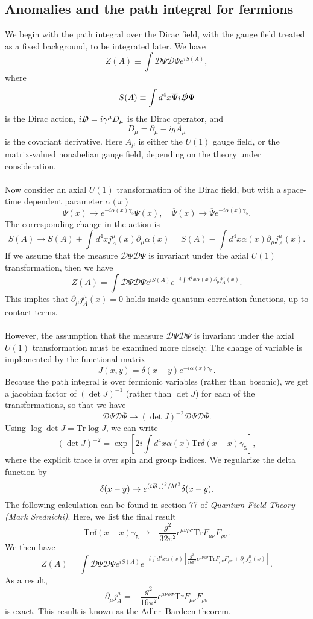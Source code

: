 \subsection{Anomalies and the path integral for fermions}
We begin with the path integral over the Dirac field, with the gauge field treated as a fixed background, to be integrated later. We have
\[Z(A) \equiv \int \mathcal{D}\Psi \mathcal{D}\overline{\Psi} e^{iS(A)},\]
where
\[S(A) \equiv \int d^4x \overline{\Psi}i\slashed{D}\Psi\]
is the Dirac action, $i\slashed{D} = i\gamma^{\mu} D_{\mu}$
is the Dirac operator, and
\[D_{\mu} = \partial_{\mu} - igA_{\mu}\]
is the covariant derivative. 
Here $A_{\mu}$ is either the $U(1)$ gauge field, or the matrix-valued nonabelian gauge field, depending on the theory under consideration.
\\ \\
Now consider an axial $U(1)$ transformation of the Dirac field, but with a space-time dependent parameter $\alpha(x)$
\[\Psi(x) \to e^{-i\alpha(x)\gamma_5}\Psi(x) , \quad \overline{\Psi}(x) \to \overline{\Psi} e^{-i\alpha(x)\gamma_5}.\]
The corresponding change in the action is
\[S(A) \to S(A) + \int d^4x j^{\mu}_A(x) \partial_{\mu}\alpha(x) = S(A) - \int d^4x \alpha(x) \partial_{\mu}j^{\mu}_A(x) .\]
If we assume that the measure $\mathcal{D}\Psi \mathcal{D}\overline{\Psi}$ is invariant under the axial $U(1)$ transformation, then we have
\[Z(A) = \int \mathcal{D}\Psi \mathcal{D}\overline{\Psi} e^{iS(A)} e^{-i \int d^4x \alpha(x)\partial_{\mu}j^{\mu}_A(x) }.\]
This implies that $\partial_{\mu}j^{\mu}_A(x) = 0$ holds inside quantum correlation functions, up to contact terms.
\\ \\
However, the assumption that the measure $\mathcal{D}\Psi \mathcal{D}\overline{\Psi}$ is invariant under the axial $U(1)$ transformation must be examined more closely. The change of variable is implemented by the functional matrix
\[J(x,y) = \delta(x-y)e^{-i\alpha(x)\gamma_5} .\]
Because the path integral is over fermionic variables (rather than bosonic), we get a jacobian factor of $(\det J)^{-1}$ (rather than $\det J$) for each of the transformations, so that we have
\[\mathcal{D}\Psi \mathcal{D}\overline{\Psi} \to (\det J)^{-2}\mathcal{D}\Psi \mathcal{D}\overline{\Psi}.\]
Using $\log \det J = \mathrm{Tr} \log J$, we can write
\[(\det J)^{-2} = \exp \left[2i \int d^4x \alpha(x) \mathrm{Tr}\delta(x-x)\gamma_5 \right],\]
where the explicit trace is over spin and group indices. We regularize the delta function by
\[\delta(x-y) \to e^{(i\slashed{D}_x)^2/M^2} \delta(x-y).\]
The following calculation can be found in section 77 of \emph{Quantum Field Theory (Mark Srednichi)}. Here, we list the final result
\[\mathrm{Tr} \delta(x-x)\gamma_5 \to - \frac{g^2}{32\pi^2} \epsilon^{\mu\nu\rho\sigma} \mathrm{Tr} F_{\mu\nu}F_{\rho\sigma}.\]
We then have
\[Z(A) = \int \mathcal{D}\Psi \mathcal{D}\overline{\Psi} e^{iS(A)} e^{-i \int d^4x \alpha(x)[ \frac{g^2}{16\pi^2} \epsilon^{\mu\nu\rho\sigma} \mathrm{Tr} F_{\mu\nu}F_{\rho\sigma} +  \partial_{\mu}j^{\mu}_A(x)] }.\]
As a result,
\[\partial_{\mu} j^{\mu}_A = -\frac{g^2}{16\pi^2} \epsilon^{\mu\nu\rho\sigma} \mathrm{Tr} F_{\mu\nu}F_{\rho\sigma}\]
is exact. This result is known as the Adler–Bardeen theorem.


